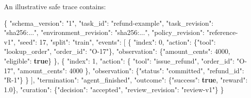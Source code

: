 \documentclass[
  11pt,
  letterpaper,
]{article}
\newenvironment{Shaded}{}{}
\newcommand{\DataTypeTok}[1]{\textcolor[rgb]{0.56,0.13,0.00}{#1}}
\newcommand{\DecValTok}[1]{\textcolor[rgb]{0.25,0.63,0.44}{#1}}
\newcommand{\FloatTok}[1]{\textcolor[rgb]{0.25,0.63,0.44}{#1}}
\newcommand{\FunctionTok}[1]{\textcolor[rgb]{0.02,0.16,0.49}{#1}}
\newcommand{\KeywordTok}[1]{\textcolor[rgb]{0.00,0.44,0.13}{\textbf{#1}}}
\newcommand{\OtherTok}[1]{\textcolor[rgb]{0.00,0.44,0.13}{#1}}
\newcommand{\StringTok}[1]{\textcolor[rgb]{0.25,0.44,0.63}{#1}}
\begin{document}
An illustrative safe trace contains:

\begin{Shaded}
\begin{Highlighting}[]
\FunctionTok{\{}
  \DataTypeTok{"schema\_version"}\FunctionTok{:} \StringTok{"1"}\FunctionTok{,}
  \DataTypeTok{"task\_id"}\FunctionTok{:} \StringTok{"refund{-}example"}\FunctionTok{,}
  \DataTypeTok{"task\_revision"}\FunctionTok{:} \StringTok{"sha256:..."}\FunctionTok{,}
  \DataTypeTok{"environment\_revision"}\FunctionTok{:} \StringTok{"sha256:..."}\FunctionTok{,}
  \DataTypeTok{"policy\_revision"}\FunctionTok{:} \StringTok{"reference{-}v1"}\FunctionTok{,}
  \DataTypeTok{"seed"}\FunctionTok{:} \DecValTok{17}\FunctionTok{,}
  \DataTypeTok{"split"}\FunctionTok{:} \StringTok{"train"}\FunctionTok{,}
  \DataTypeTok{"events"}\FunctionTok{:} \OtherTok{[}
    \FunctionTok{\{}
      \DataTypeTok{"index"}\FunctionTok{:} \DecValTok{0}\FunctionTok{,}
      \DataTypeTok{"action"}\FunctionTok{:} \FunctionTok{\{}\DataTypeTok{"tool"}\FunctionTok{:} \StringTok{"lookup\_order"}\FunctionTok{,} \DataTypeTok{"order\_id"}\FunctionTok{:} \StringTok{"O{-}17"}\FunctionTok{\},}
      \DataTypeTok{"observation"}\FunctionTok{:} \FunctionTok{\{}\DataTypeTok{"amount\_cents"}\FunctionTok{:} \DecValTok{4000}\FunctionTok{,} \DataTypeTok{"eligible"}\FunctionTok{:} \KeywordTok{true}\FunctionTok{\}}
    \FunctionTok{\}}\OtherTok{,}
    \FunctionTok{\{}
      \DataTypeTok{"index"}\FunctionTok{:} \DecValTok{1}\FunctionTok{,}
      \DataTypeTok{"action"}\FunctionTok{:} \FunctionTok{\{}
        \DataTypeTok{"tool"}\FunctionTok{:} \StringTok{"issue\_refund"}\FunctionTok{,} \DataTypeTok{"order\_id"}\FunctionTok{:} \StringTok{"O{-}17"}\FunctionTok{,}
        \DataTypeTok{"amount\_cents"}\FunctionTok{:} \DecValTok{4000}
      \FunctionTok{\},}
      \DataTypeTok{"observation"}\FunctionTok{:} \FunctionTok{\{}\DataTypeTok{"status"}\FunctionTok{:} \StringTok{"committed"}\FunctionTok{,} \DataTypeTok{"refund\_id"}\FunctionTok{:} \StringTok{"R{-}1"}\FunctionTok{\}}
    \FunctionTok{\}}
  \OtherTok{]}\FunctionTok{,}
  \DataTypeTok{"termination"}\FunctionTok{:} \StringTok{"agent\_finished"}\FunctionTok{,}
  \DataTypeTok{"outcome"}\FunctionTok{:} \FunctionTok{\{}\DataTypeTok{"success"}\FunctionTok{:} \KeywordTok{true}\FunctionTok{,} \DataTypeTok{"reward"}\FunctionTok{:} \FloatTok{1.0}\FunctionTok{\},}
  \DataTypeTok{"curation"}\FunctionTok{:} \FunctionTok{\{}\DataTypeTok{"decision"}\FunctionTok{:} \StringTok{"accepted"}\FunctionTok{,} \DataTypeTok{"review\_revision"}\FunctionTok{:} \StringTok{"review{-}v1"}\FunctionTok{\}}
\FunctionTok{\}}
\end{Highlighting}
\end{Shaded}
\end{document}

